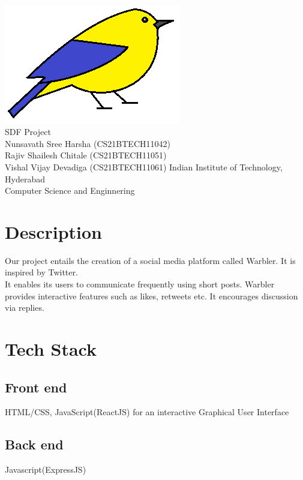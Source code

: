 \documentclass[journal,12pt,onecolumn]{IEEEtran}
\begin{document}
\begin{titlepage}
    \begin{center}
        \vspace*{1 cm}
         \\
        \vspace*{1 cm}
        \includegraphics[width=0.3\linewidth]{./media/logo.png}\\[1ex]
        \vspace{1 cm}
        \LARGE {SDF Project} \\
        \vspace{1 cm}
        \large {Nunsavath Sree Harsha (CS21BTECH11042) \\ Rajiv Shailesh Chitale (CS21BTECH11051) \\ Vishal Vijay Devadiga (CS21BTECH11061)}
        \vfill
        \large Indian Institute of Technology, Hyderabad \\ Computer Science and Enginnering
    \end{center}
\end{titlepage}
%
\section*{\textbf{Description}}
\noindent Our project entails the creation of a social media platform called {\color{blue}Warbler}. 
It is inspired by Twitter. \\
It enables its users to communicate frequently using short posts. 
Warbler provides interactive features such as likes, retweets etc. 
It encourages discussion via replies.

\section*{\textbf{Tech Stack}}
\subsection*{\textbf{Front end}} HTML/CSS, JavaScript(ReactJS) for an interactive Graphical User Interface
\subsection*{\textbf{Back end}} Javascript(ExpressJS)
\end{document}
